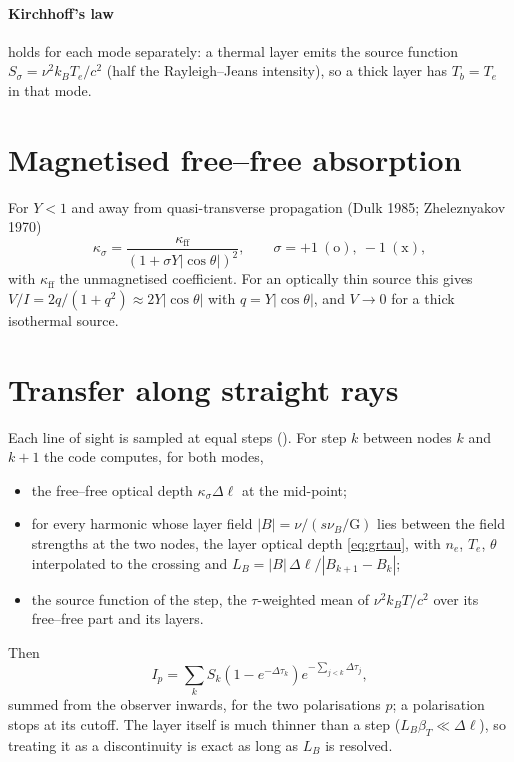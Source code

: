 \paragraph{Kirchhoff's law} holds for each mode separately: a thermal layer emits the
source function $S_\sigma=\nu^2k_BT_e/c^2$ (half the Rayleigh--Jeans intensity), so a thick
layer has $T_b=T_e$ in that mode.

\section{Magnetised free--free absorption}
For $Y<1$ and away from quasi-transverse propagation (Dulk 1985; Zheleznyakov 1970)
\begin{equation}
  \kappa_\sigma=\frac{\kappa_\text{ff}}{(1+\sigma Y|\cos\theta|)^2},\qquad
  \sigma=+1\ (\text{o}),\ -1\ (\text{x}),
\end{equation}
with $\kappa_\text{ff}$ the unmagnetised coefficient. For an optically thin source this
gives $V/I=2q/(1+q^2)\approx2Y|\cos\theta|$ with $q=Y|\cos\theta|$, and $V\to0$ for a thick
isothermal source.

\section{Transfer along straight rays}
Each line of sight is sampled at equal steps (). For step $k$
between nodes $k$ and $k+1$ the code computes, for both modes,
\begin{itemize}[itemsep=1pt]
\item the free--free optical depth $\kappa_\sigma\Delta\ell$ at the mid-point;
\item for every harmonic whose layer field $|B|=\nu/(s\nu_B/\text{G})$ lies between the
  field strengths at the two nodes, the layer optical depth \eqref{eq:grtau}, with
  $n_e$, $T_e$, $\theta$ interpolated to the crossing and
  $L_B=|B|\,\Delta\ell/|B_{k+1}-B_k|$;
\item the source function of the step, the $\tau$-weighted mean of $\nu^2k_BT/c^2$ over
  its free--free part and its layers.
\end{itemize}
Then
\begin{equation}
  I_p=\sum_k S_k\left(1-e^{-\Delta\tau_k}\right)e^{-\sum_{j<k}\Delta\tau_j},
\end{equation}
summed from the observer inwards, for the two polarisations $p$; a polarisation stops at
its cutoff. The layer itself is much thinner than a step ($L_B\beta_T\ll\Delta\ell$), so
treating it as a discontinuity is exact as long as $L_B$ is resolved.

